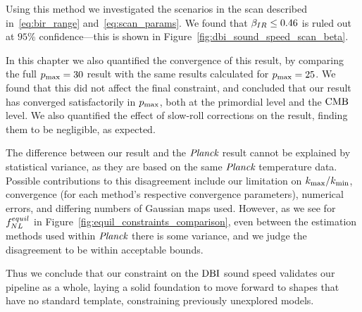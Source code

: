     Using this method we investigated the scenarios in the scan described in~\eqref{eq:bir_range}
    and~\eqref{eq:scan_params}. We found that $\beta_{IR}\le0.46$ is ruled out at $95\%$ confidence---this
    is shown in Figure~\ref{fig:dbi_sound_speed_scan_beta}.


    In this chapter we also quantified the convergence of this result, by comparing the full $p_\text{max}=30$
    result with the same results calculated for $p_\text{max}=25$. We found that this did not affect the
    final constraint, and concluded that our result has converged satisfactorily in $p_\text{max}$,
    both at the primordial level and the $\text{CMB}$ level.
    We also quantified the effect of slow-roll corrections on the result,
    finding them to be negligible, as expected.


    The difference between our result and the $\textit{Planck}$ result cannot be explained by
    statistical variance, as they are based on the same $\textit{Planck}$ temperature data.
    Possible contributions to this disagreement include
    our limitation on ${k_\text{max}}/{k_\text{min}}$,
    convergence (for each method's respective convergence parameters),
    numerical errors, and differing numbers of Gaussian maps used.
    However, as we see for $f^{equil}_{NL}$ in Figure~\ref{fig:equil_constraints_comparison},
    even between the estimation methods used within $\textit{Planck}$ there is some variance,
    and we judge the disagreement to be within acceptable bounds.


    Thus we conclude that our constraint on the $\text{DBI}$ sound speed validates our pipeline as a whole,
    laying a solid foundation to move forward to shapes that have no standard template,
    constraining previously unexplored models.


